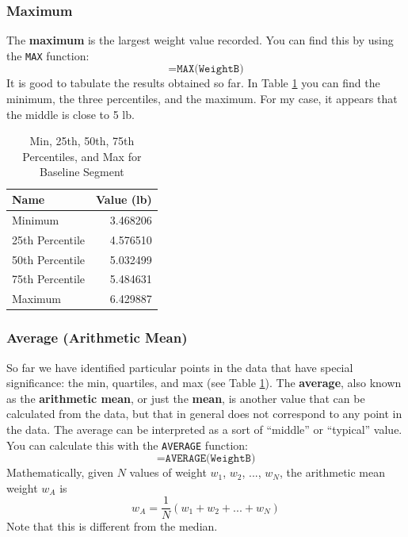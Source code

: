 \subsubsection{Maximum}
The \textbf{maximum} is the largest weight value recorded. You can find this by using the \texttt{MAX} function:
\begin{equation}
    \texttt{=MAX(WeightB)}
\end{equation}
It is good to tabulate the results obtained so far. In Table \ref{table:00.baseline.descriptive} you can find the minimum, the three percentiles, and the maximum. For my case, it appears that the middle is close to 5 lb.
\begin{table}
    \centering
	\begin{tabular}{|l|r|} \hline
        \textbf{Name} & \textbf{Value (lb)} \\
        \hline
		Minimum & 3.468206 \\
		25th Percentile & 4.576510 \\
		50th Percentile & 5.032499 \\
		75th Percentile & 5.484631 \\
		Maximum & 6.429887 \\
		\hline
	\end{tabular}
    \caption{Min, 25th, 50th, 75th Percentiles, and Max for Baseline Segment}
    \label{table:00.baseline.descriptive}
\end{table}
\subsubsection{Average (Arithmetic Mean)}
So far we have identified particular points in the data that have special significance: the min, quartiles, and max (see Table \ref{table:00.baseline.descriptive}). The \textbf{average}, also known as the \textbf{arithmetic mean}, or just the \textbf{mean}, is another value that can be calculated from the data, but that in general does not correspond to any point in the data. The average can be interpreted as a sort of ``middle'' or ``typical'' value. You can calculate this with the \texttt{AVERAGE} function:
\begin{equation}
    \texttt{=AVERAGE(WeightB)}
\end{equation}
Mathematically, given $N$ values of weight $w_{1}$, $w_{2}$, ..., $w_{N}$, the arithmetic mean weight $w_{A}$ is
\begin{equation}
    w_{A} = \frac{1}{N} \left( w_{1} + w_{2} + ... + w_{N} \right)
\end{equation}
Note that this is different from the median.
